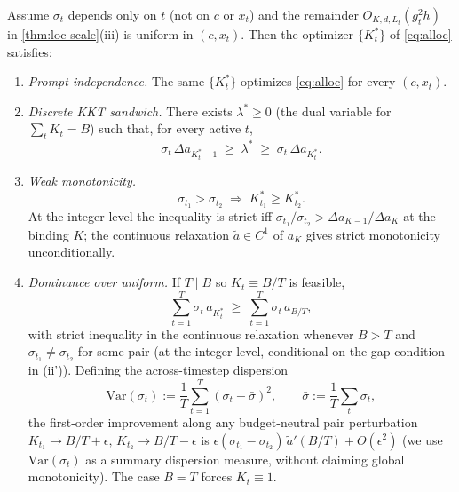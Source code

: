 \begin{theorem}
\label{thm:offline}
Assume $\sigma_t$ depends only on $t$ (not on $c$ or $x_t$) and the remainder $O_{K,d,L_t}(g_t^2 h)$ in \cref{thm:loc-scale}\textup{(iii)} is uniform in $(c,x_t)$. Then the optimizer $\{K_t^*\}$ of \cref{eq:alloc} satisfies:
\begin{enumerate}
\item[\textup{(i)}] \emph{Prompt-independence.} The same $\{K_t^*\}$ optimizes \cref{eq:alloc} for every $(c, x_t)$.

\item[\textup{(ii)}] \emph{Discrete KKT sandwich.} There exists $\lambda^* \ge 0$ (the dual variable for $\sum_t K_t = B$) such that, for every active $t$,
\begin{equation}
  \sigma_t\,\Delta a_{K_t^* - 1} \;\ge\; \lambda^* \;\ge\; \sigma_t\,\Delta a_{K_t^*}.
  \label{eq:kkt-sandwich}
\end{equation}

\item[\textup{(ii')}] \emph{Weak monotonicity.}
\begin{equation}
  \sigma_{t_1} > \sigma_{t_2} \;\Longrightarrow\; K_{t_1}^* \ge K_{t_2}^*.
\end{equation}
At the integer level the inequality is strict iff $\sigma_{t_1}/\sigma_{t_2} > \Delta a_{K-1}/\Delta a_K$ at the binding $K$; the continuous relaxation $\tilde a \in C^1$ of $a_K$ gives strict monotonicity unconditionally.

\item[\textup{(iii)}] \emph{Dominance over uniform.} If $T \mid B$ so $K_t \equiv B/T$ is feasible,
\begin{equation}
  \sum_{t=1}^T \sigma_t\,a_{K_t^*} \;\ge\; \sum_{t=1}^T \sigma_t\,a_{B/T},
  \label{eq:dominance}
\end{equation}
with strict inequality in the continuous relaxation whenever $B > T$ and $\sigma_{t_1}\ne\sigma_{t_2}$ for some pair (at the integer level, conditional on the gap condition in (ii')). Defining the across-timestep dispersion
\begin{equation}
  \mathrm{Var}(\sigma_t) := \frac{1}{T}\sum_{t=1}^T (\sigma_t - \bar\sigma)^2, \qquad \bar\sigma := \frac{1}{T}\sum_t \sigma_t,
  \label{eq:dispersion}
\end{equation}
the first-order improvement along any budget-neutral pair perturbation $K_{t_1}\to B/T+\epsilon,\,K_{t_2}\to B/T-\epsilon$ is $\epsilon(\sigma_{t_1}-\sigma_{t_2})\,\tilde a'(B/T)+O(\epsilon^2)$ (we use $\mathrm{Var}(\sigma_t)$ as a summary dispersion measure, without claiming global monotonicity). The case $B=T$ forces $K_t\equiv 1$.
\end{enumerate}
\end{theorem}

